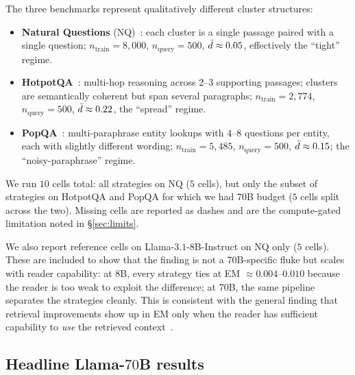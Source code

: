 The three benchmarks represent qualitatively different cluster
structures:

\begin{itemize}[leftmargin=1.8em, itemsep=2pt]
\item \textbf{Natural Questions} (NQ)~\cite{kwiatkowski2019nq}: each
cluster is a single passage paired with a single question;
$n_{\mathrm{train}} = 8{,}000$, $n_{\mathrm{query}} = 500$, $\bar{d}
\approx 0.05$, effectively the ``tight'' regime.
\item \textbf{HotpotQA}~\cite{yang2018hotpotqa}: multi-hop reasoning
across $2$--$3$ supporting passages; clusters are semantically
coherent but span several paragraphs; $n_{\mathrm{train}} = 2{,}774$,
$n_{\mathrm{query}} = 500$, $\bar{d} \approx 0.22$, the ``spread''
regime.
\item \textbf{PopQA}~\cite{mallen2023popqa}: multi-paraphrase entity
lookups with $4$--$8$ questions per entity, each with slightly
different wording; $n_{\mathrm{train}} = 5{,}485$, $n_{\mathrm{query}}
= 500$, $\bar{d} \approx 0.15$; the ``noisy-paraphrase'' regime.
\end{itemize}

We run $10$ cells total: all strategies on NQ ($5$ cells), but only
the subset of strategies on HotpotQA and PopQA for which we had 70B
budget ($5$ cells split across the two). Missing cells are reported
as dashes and are the compute-gated limitation noted in
\S\ref{sec:limits}.

We also report reference cells on Llama-$3.1$-$8$B-Instruct on NQ
only ($5$ cells). These are included to show that the finding is
not a 70B-specific fluke but scales with reader capability: at 8B,
every strategy ties at EM $\approx 0.004$--$0.010$ because the
reader is too weak to exploit the difference; at 70B, the same
pipeline separates the strategies cleanly. This is consistent with
the general finding that retrieval improvements show up in EM only
when the reader has sufficient capability to \emph{use} the
retrieved context~\cite{borgeaud2022retro, izacard2021fid}.

\subsection{Headline Llama-$70$B results}
\label{sec:e7:results}

